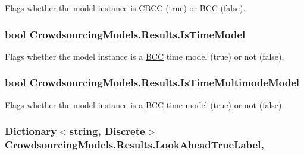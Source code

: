Flags whether the model instance is \hyperlink{class_crowdsourcing_models_1_1_c_b_c_c}{C\+B\+C\+C} (true) or \hyperlink{class_crowdsourcing_models_1_1_b_c_c}{B\+C\+C} (false). 

\hypertarget{class_crowdsourcing_models_1_1_results_a9b530081d9a4d406f071c7a3e8e3fb71}{}
\subsubsection[{Is\+Time\+Model}]{\setlength{\rightskip}{0pt plus 5cm}bool Crowdsourcing\+Models.\+Results.\+Is\+Time\+Model\hspace{0.3cm}{\ttfamily [get]}}\label{class_crowdsourcing_models_1_1_results_a9b530081d9a4d406f071c7a3e8e3fb71}


Flags whether the model instance is a \hyperlink{class_crowdsourcing_models_1_1_b_c_c}{B\+C\+C} time model (true) or not (false). 

\hypertarget{class_crowdsourcing_models_1_1_results_a0ddff489da9fc4daab54d8fcc7163acb}{}
\subsubsection[{Is\+Time\+Multimode\+Model}]{\setlength{\rightskip}{0pt plus 5cm}bool Crowdsourcing\+Models.\+Results.\+Is\+Time\+Multimode\+Model\hspace{0.3cm}{\ttfamily [get]}}\label{class_crowdsourcing_models_1_1_results_a0ddff489da9fc4daab54d8fcc7163acb}


Flags whether the model instance is a \hyperlink{class_crowdsourcing_models_1_1_b_c_c}{B\+C\+C} time model (true) or not (false). 

\hypertarget{class_crowdsourcing_models_1_1_results_afc8f124040ec1cb49c569bae611aaa93}{}
\subsubsection[{Look\+Ahead\+True\+Label}]{\setlength{\rightskip}{0pt plus 5cm}Dictionary$<$string, Discrete$>$ Crowdsourcing\+Models.\+Results.\+Look\+Ahead\+True\+Label\hspace{0.3cm}{\ttfamily [get]}, {}}\label{class_crowdsourcing_models_1_1_results_afc8f124040ec1cb49c569bae611aaa93}


